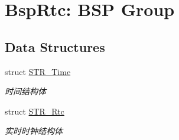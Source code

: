 \hypertarget{group___r_t_c}{\section{\-Bsp\-Rtc\-: \-B\-S\-P \-Group}
\label{group___r_t_c}
}
\subsection*{\-Data \-Structures}
\begin{DoxyCompactItemize}
\item 
struct \hyperlink{struct_s_t_r___time}{\-S\-T\-R\-\_\-\-Time}
\begin{DoxyCompactList}\small\item\em 时间结构体 \end{DoxyCompactList}\item 
struct \hyperlink{struct_s_t_r___rtc}{\-S\-T\-R\-\_\-\-Rtc}
\begin{DoxyCompactList}\small\item\em 实时时钟结构体 \end{DoxyCompactList}\end{DoxyCompactItemize}
